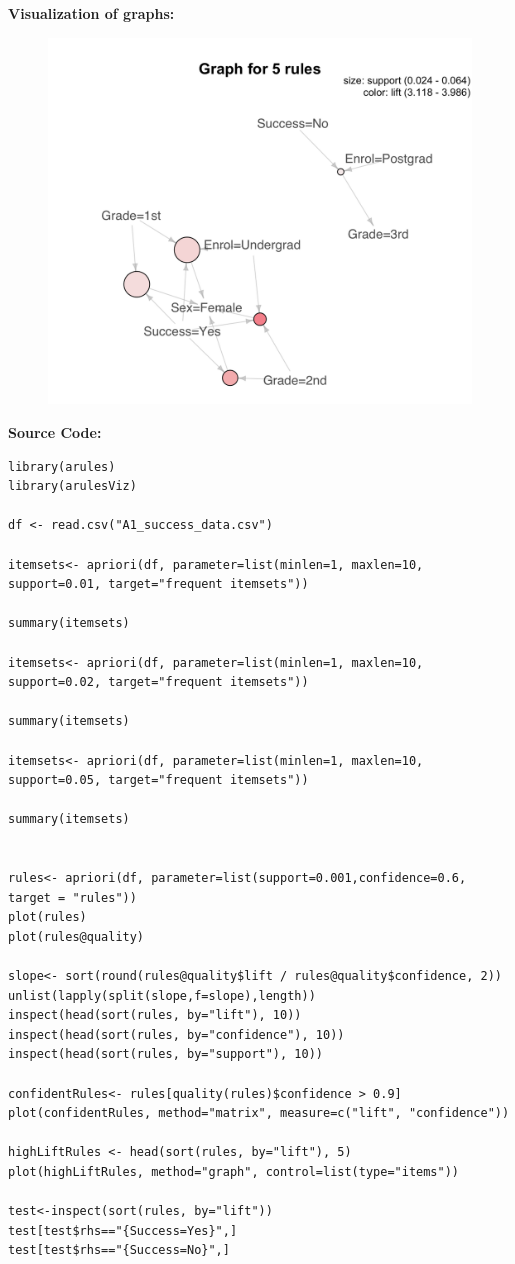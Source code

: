 \documentclass{article}
\begin{document}
\textbf{Visualization of graphs:}
\begin{figure}[H]
    \includegraphics[width=1\textwidth]{Fig13}
\end{figure}

\textbf{Source Code:}
\begin{lstlisting}
library(arules)
library(arulesViz)

df <- read.csv("A1_success_data.csv")

itemsets<- apriori(df, parameter=list(minlen=1, maxlen=10, support=0.01, target="frequent itemsets"))

summary(itemsets)

itemsets<- apriori(df, parameter=list(minlen=1, maxlen=10, support=0.02, target="frequent itemsets"))

summary(itemsets)

itemsets<- apriori(df, parameter=list(minlen=1, maxlen=10, support=0.05, target="frequent itemsets"))

summary(itemsets)


rules<- apriori(df, parameter=list(support=0.001,confidence=0.6, target = "rules"))
plot(rules)
plot(rules@quality)

slope<- sort(round(rules@quality$lift / rules@quality$confidence, 2))
unlist(lapply(split(slope,f=slope),length))
inspect(head(sort(rules, by="lift"), 10))
inspect(head(sort(rules, by="confidence"), 10))
inspect(head(sort(rules, by="support"), 10))

confidentRules<- rules[quality(rules)$confidence > 0.9]
plot(confidentRules, method="matrix", measure=c("lift", "confidence"))

highLiftRules <- head(sort(rules, by="lift"), 5) 
plot(highLiftRules, method="graph", control=list(type="items"))

test<-inspect(sort(rules, by="lift"))
test[test$rhs=="{Success=Yes}",]
test[test$rhs=="{Success=No}",]

\end{lstlisting}
\end{document}
